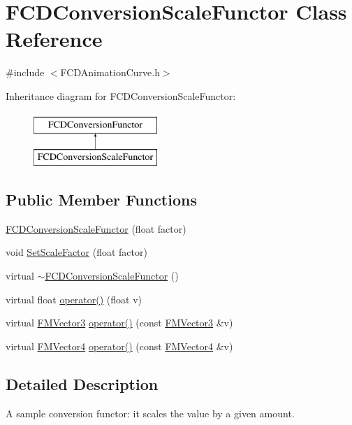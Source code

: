 \hypertarget{classFCDConversionScaleFunctor}{
\section{FCDConversionScaleFunctor Class Reference}
\label{classFCDConversionScaleFunctor}
}


{\ttfamily \#include $<$FCDAnimationCurve.h$>$}

Inheritance diagram for FCDConversionScaleFunctor:\begin{figure}[H]
\begin{center}
\leavevmode
\includegraphics[height=2.000000cm]{classFCDConversionScaleFunctor}
\end{center}
\end{figure}
\subsection*{Public Member Functions}
\begin{DoxyCompactItemize}
\item 
\hyperlink{classFCDConversionScaleFunctor_a82e1e5fdf55999dd2d9a12a886003b0c}{FCDConversionScaleFunctor} (float factor)
\item 
void \hyperlink{classFCDConversionScaleFunctor_a5e5f3036da8df4e3c5304346627108ec}{SetScaleFactor} (float factor)
\item 
virtual \hyperlink{classFCDConversionScaleFunctor_a56b2908039ef33c68f5ea9fe3c207d0b}{$\sim$FCDConversionScaleFunctor} ()
\item 
virtual float \hyperlink{classFCDConversionScaleFunctor_a7e4410b974d4d79b5c7211cc42032d87}{operator()} (float v)
\item 
virtual \hyperlink{classFMVector3}{FMVector3} \hyperlink{classFCDConversionScaleFunctor_a0a978f0896ca17db695e5acf08d6da9c}{operator()} (const \hyperlink{classFMVector3}{FMVector3} \&v)
\item 
virtual \hyperlink{classFMVector4}{FMVector4} \hyperlink{classFCDConversionScaleFunctor_a4ed5f3f3fa4619b3374442a3f4c3de5a}{operator()} (const \hyperlink{classFMVector4}{FMVector4} \&v)
\end{DoxyCompactItemize}


\subsection{Detailed Description}
A sample conversion functor: it scales the value by a given amount. 

